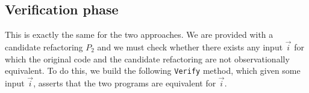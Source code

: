 \documentclass[sigconf]{acmart}
\begin{document}






\subsection{Verification phase}
This is exactly the same for the two approaches.
We are provided with a candidate
refactoring $P_2$ and we must check whether there exists any input
$\vec{i}$ for which the original code and the candidate
refactoring are not observationally equivalent.  To do this, we build
the following \lstinline[breaklines=true]{Verify} method, which given some input
$\vec{i}$, asserts that the two programs are equivalent for
$\vec{i}$.
\end{document}
